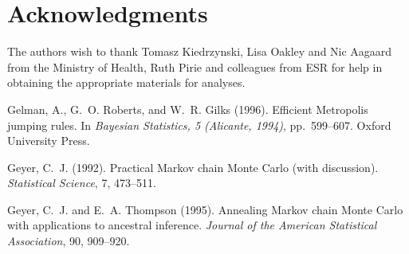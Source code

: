 \documentclass{article}
\begin{document}
\section{Acknowledgments}
The authors wish to thank Tomasz Kiedrzynski, Lisa Oakley and Nic Aagaard from the Ministry of Health, Ruth Pirie and colleagues from ESR for help in obtaining the appropriate materials for analyses.

\begin{thebibliography}{}

Gelman, A., G.~O. Roberts, and W.~R. Gilks (1996).
\newblock Efficient Metropolis jumping rules.
\newblock In \emph{Bayesian Statistics, 5 (Alicante, 1994)}, pp.~599--607.
  Oxford University Press.

Geyer, C.~J. (1992).
\newblock Practical Markov chain Monte Carlo (with discussion).
\newblock \emph{Statistical Science}, 7, 473--511.

Geyer, C.~J. and E.~A. Thompson (1995).
\newblock Annealing Markov chain Monte Carlo with applications to
    ancestral inference.
\newblock \emph{Journal of the American Statistical Association}, 90, 909--920.

\end{thebibliography}
\end{document}
